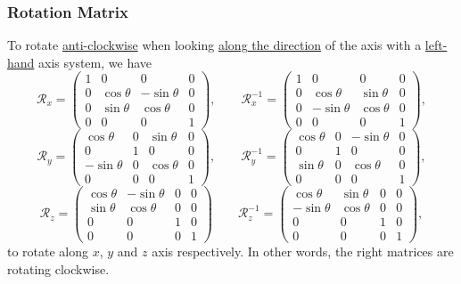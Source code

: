 \documentclass[twocolumn,landscape,10pt]{article}
\theoremstyle{definition}
\begin{document}
\subsubsection{Rotation Matrix}

To rotate \underline{anti-clockwise} when looking \underline{along the direction} 
of the axis with a \underline{left-hand} axis system, we have
\[
    \mathcal{R}_x=
    \begin{pmatrix}
        1 & 0 & 0 & 0 \\
        0 & \cos{\theta} & -\sin{\theta} & 0 \\
        0 & \sin{\theta} & \cos{\theta} & 0 \\
        0 & 0 & 0 & 1
    \end{pmatrix}, \qquad
    \mathcal{R}_x^{-1}=
    \begin{pmatrix}
        1 & 0 & 0 & 0 \\
        0 & \cos{\theta} & \sin{\theta} & 0 \\
        0 & -\sin{\theta} & \cos{\theta} & 0 \\
        0 & 0 & 0 & 1
    \end{pmatrix},
\]
\[
    \mathcal{R}_y=
    \begin{pmatrix}
        \cos{\theta} & 0 & \sin{\theta} & 0 \\
        0 & 1 & 0 & 0 \\
        -\sin{\theta} & 0 & \cos{\theta} & 0 \\
        0 & 0 & 0 & 1
    \end{pmatrix}, \qquad
    \mathcal{R}_y^{-1}=
    \begin{pmatrix}
        \cos{\theta} & 0 & -\sin{\theta} & 0 \\
        0 & 1 & 0 & 0 \\
        \sin{\theta} & 0 & \cos{\theta} & 0 \\
        0 & 0 & 0 & 1
    \end{pmatrix}, 
\]
\[
    \mathcal{R}_z=
    \begin{pmatrix}
        \cos{\theta} & -\sin{\theta} & 0 & 0 \\
        \sin{\theta} & \cos{\theta} & 0 & 0 \\
        0 & 0 & 1 & 0 \\
        0 & 0 & 0 & 1
    \end{pmatrix} \qquad
    \mathcal{R}_z^{-1}=
    \begin{pmatrix}
        \cos{\theta} & \sin{\theta} & 0 & 0 \\
        -\sin{\theta} & \cos{\theta} & 0 & 0 \\
        0 & 0 & 1 & 0 \\
        0 & 0 & 0 & 1
    \end{pmatrix},
\]
to rotate along $x$, $y$ and $z$ axis respectively.
In other words, the right matrices are rotating clockwise.
\end{document}
